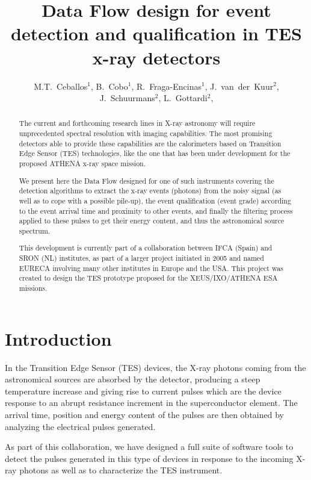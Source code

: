 \documentclass[11pt,twoside]{article}
\begin{document}
\title{Data Flow design for event detection and qualification 
in TES x-ray detectors}
\author{M.T.~Ceballos$^1$, B.~Cobo$^1$, R.~Fraga-Encinas$^1$, J.~van~der~Kuur$^2$, J.~Schuurmans$^2$, L.~Gottardi$^2$,
}

\begin{abstract}
The current and forthcoming research lines in X-ray astronomy will require unprecedented 
spectral resolution with imaging capabilities. The most promising detectors able to provide 
these capabilities are the calorimeters based on Transition Edge Sensor (TES) technologies, like 
the one that has been under development for the proposed ATHENA x-ray space mission.

We present here the Data Flow designed for one of such instruments covering the 
detection algorithms to extract the x-ray events (photons) from the noisy signal (as well as to cope with 
a possible pile-up), the event qualification (event grade) according to the event arrival time
 and proximity to other events, and finally the filtering process applied to these pulses to 
get their energy content, and thus the astronomical source spectrum.

This development is currently part of a collaboration between
IFCA (Spain) and SRON (NL) institutes, as part of a larger project initiated in 2005 and 
named EURECA \citep{deKorte_2009} involving many other institutes in Europe and the USA. This project was created to
design the TES prototype proposed for the XEUS/IXO/ATHENA ESA missions.
\end{abstract}

\section{Introduction}

In the Transition Edge Sensor (TES) devices, the X-ray photons coming from the astronomical sources 
are absorbed by the detector, producing a steep temperature increase and giving rise to current
pulses which are the device response to an abrupt resistance increment in the superconductor element. 
The arrival time, position and energy content of the pulses are then obtained by
analyzing the electrical pulses generated.

As part of this collaboration, we have designed a full suite of software tools \citep{ceballos_2011} 
to detect the pulses generated in this type of devices in response to the incoming X-ray photons 
as well as to characterize the TES instrument. 
\end{document}

